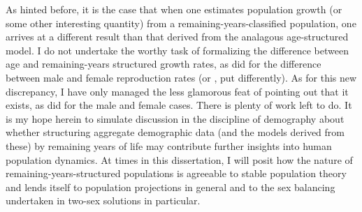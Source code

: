 As hinted before, it is the case that when one estimates population growth (or
some other interesting quantity) from a remaining-years-classified population,
one arrives at a different result than that derived from the analagous
age-structured model. I do not undertake the worthy task of formalizing the
difference between age and remaining-years structured growth rates, as did
\citet{karmel1947relations} for the difference between male and female
reproduction rates (or \citet{coale1972growth}, put differently). As for this
new discrepancy, I have only managed the less glamorous feat of pointing out
that it exists, as did \citet{kuczynski1932fertility} for the male
and female cases. There is plenty of work left to do. It is my hope herein to
simulate discussion in the discipline of demography about whether structuring
aggregate demographic data (and the models derived from these) by remaining
years of life may contribute further insights into human population dynamics. At
times in this dissertation, I will posit how the nature of
remaining-years-structured populations is agreeable to stable population theory
and lends itself to population projections in general and to the sex balancing
undertaken in two-sex solutions in particular.
